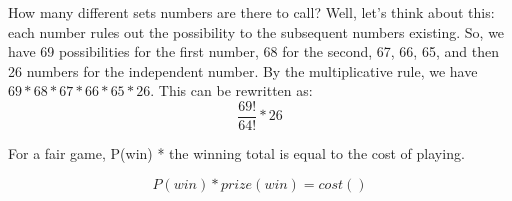 \documentclass[]{article}
\begin{document}
		How many different sets numbers are there to call? Well, let's think about this: each number rules out the possibility to the subsequent numbers existing.
		So, we have 69 possibilities for the first number, 68 for the second, 67, 66, 65, and then 26 numbers for the independent number.
		By the multiplicative rule, we have $69*68*67*66*65*26$.
		This can be rewritten as:
		\[\frac{69!}{64!}*26\]
		
		For a fair game, P(win) * the winning total is equal to the cost of playing.
		
		\begin{equation*}
			P(win) * prize(win) = cost()
		\end{equation*}
\end{document}
